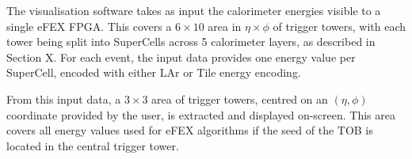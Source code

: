 The visualisation software takes as input the calorimeter energies visible to a
single \ac{eFEX} \ac{FPGA}. This covers a $6\times10$ area in $\eta\times\phi$
of trigger towers, with each tower being split into SuperCells across 5
calorimeter layers, as described in Section X.
For each event, the input data provides one energy value per SuperCell, encoded
with either LAr or Tile energy encoding.

From this input data, a $3\times3$ area of trigger towers, centred on an
$(\eta,\phi)$ coordinate provided by the user, is extracted and displayed
on-screen. This area covers all energy values used for \ac{eFEX} algorithms if
the seed of the TOB is located in the central trigger tower.

